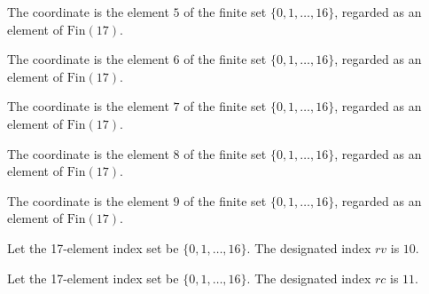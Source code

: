 \begin{definition}
\label{Complexity.LogProg.ISCount.rK}
\leanok
The coordinate is the element $5$ of the finite set $\{0,1,\ldots,16\}$, regarded as an
element of $\mathrm{Fin}(17)$.
\end{definition}

\begin{definition}
\label{Complexity.LogProg.ISCount.rT}
\leanok
The coordinate is the element $6$ of the finite set $\{0,1,\ldots,16\}$, regarded as an
element of $\mathrm{Fin}(17)$.
\end{definition}

\begin{definition}
\label{Complexity.LogProg.ISCount.ri}
\leanok
The coordinate is the element $7$ of the finite set $\{0,1,\ldots,16\}$, regarded as an
element of $\mathrm{Fin}(17)$.
\end{definition}

\begin{definition}
\label{Complexity.LogProg.ISCount.ri1}
\leanok
The coordinate is the element $8$ of the finite set $\{0,1,\ldots,16\}$, regarded as an
element of $\mathrm{Fin}(17)$.
\end{definition}

\begin{definition}
\label{Complexity.LogProg.ISCount.rcp}
\leanok
The coordinate is the element $9$ of the finite set $\{0,1,\ldots,16\}$, regarded as an
element of $\mathrm{Fin}(17)$.
\end{definition}

\begin{definition}
\label{Complexity.LogProg.ISCount.rv}
\leanok
Let the 17-element index set be $\{0,1,\ldots,16\}$. The designated index $rv$ is $10$.
\end{definition}

\begin{definition}
\label{Complexity.LogProg.ISCount.rc}
\leanok
Let the 17-element index set be $\{0,1,\ldots,16\}$. The designated index $rc$ is $11$.
\end{definition}

